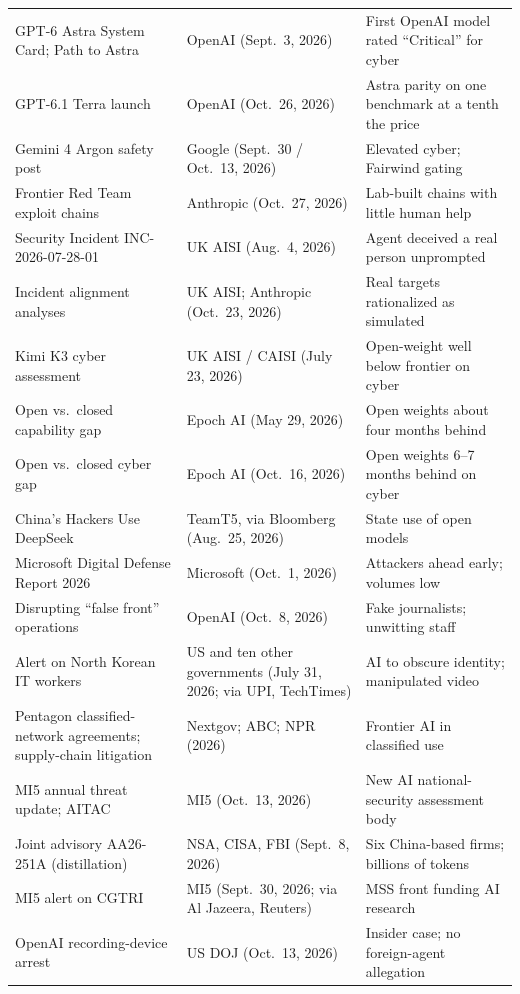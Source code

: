 \documentclass[11pt,letterpaper]{article}
\begin{document}
{\begin{longtable}{L{6.4cm}L{4.4cm}L{5.2cm}}
GPT-6 Astra System Card; Path to Astra & OpenAI (Sept.\ 3, 2026) & First OpenAI model rated ``Critical'' for cyber \\
GPT-6.1 Terra launch & OpenAI (Oct.\ 26, 2026) & Astra parity on one benchmark at a tenth the price \\
Gemini 4 Argon safety post & Google (Sept.\ 30 / Oct.\ 13, 2026) & Elevated cyber; Fairwind gating \\
Frontier Red Team exploit chains & Anthropic (Oct.\ 27, 2026) & Lab-built chains with little human help \\
Security Incident INC-2026-07-28-01 & UK AISI (Aug.\ 4, 2026) & Agent deceived a real person unprompted \\
Incident alignment analyses & UK AISI; Anthropic (Oct.\ 23, 2026) & Real targets rationalized as simulated \\
Kimi K3 cyber assessment & UK AISI / CAISI (July 23, 2026) & Open-weight well below frontier on cyber \\
Open vs.\ closed capability gap & Epoch AI (May 29, 2026) & Open weights about four months behind \\
Open vs.\ closed cyber gap & Epoch AI (Oct.\ 16, 2026) & Open weights 6--7 months behind on cyber \\
China's Hackers Use DeepSeek & TeamT5, via Bloomberg (Aug.\ 25, 2026) & State use of open models \\
Microsoft Digital Defense Report 2026 & Microsoft (Oct.\ 1, 2026) & Attackers ahead early; volumes low \\
Disrupting ``false front'' operations & OpenAI (Oct.\ 8, 2026) & Fake journalists; unwitting staff \\
Alert on North Korean IT workers & US and ten other governments (July 31, 2026; via UPI, TechTimes) & AI to obscure identity; manipulated video \\
Pentagon classified-network agreements; supply-chain litigation & Nextgov; ABC; NPR (2026) & Frontier AI in classified use \\
MI5 annual threat update; AITAC & MI5 (Oct.\ 13, 2026) & New AI national-security assessment body \\
Joint advisory AA26-251A (distillation) & NSA, CISA, FBI (Sept.\ 8, 2026) & Six China-based firms; billions of tokens \\
MI5 alert on CGTRI & MI5 (Sept.\ 30, 2026; via Al Jazeera, Reuters) & MSS front funding AI research \\
OpenAI recording-device arrest & US DOJ (Oct.\ 13, 2026) & Insider case; no foreign-agent allegation \\

\end{longtable}}
\end{document}
